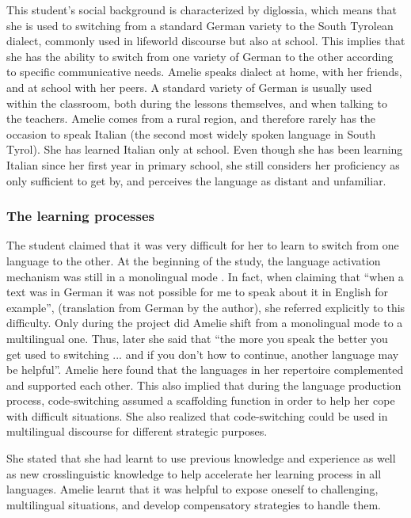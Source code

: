 \documentclass[output=paper]{../langscibook}
\begin{document}
This student’s social background is characterized by diglossia, which means that she is used to switching from a standard German variety to the South Tyrolean dialect, commonly used in lifeworld discourse but also at school. This implies that she has the ability to switch from one variety of German to the other according to specific communicative needs. Amelie speaks dialect at home, with her friends, and at school with her peers. A standard variety of German is usually used within the classroom, both during the lessons themselves, and when talking to the teachers. Amelie comes from a rural region, and therefore rarely has the occasion to speak Italian (the second most widely spoken language in South Tyrol). She has learned Italian only at school. Even though she has been learning Italian since her first year in primary school, she still considers her proficiency as only sufficient to get by, and perceives the language as distant and unfamiliar.


\subsubsection{The learning processes}

The student claimed that it was very difficult for her to learn to switch from one language to the other. At the beginning of the study, the language activation mechanism was still in a monolingual mode \citep{Grosjean2007}. In fact, when claiming that “when a text was in German it was not possible for me to speak about it in English for example”, (translation from German by the author), she referred explicitly to this difficulty. Only during the project did Amelie shift from a monolingual mode to a multilingual one. Thus, later she said that “the more you speak the better you get used to switching ... and if you don’t how to continue, another language may be helpful”. Amelie here found that the languages in her repertoire complemented and supported each other. This also implied that during the language production process, code-switching assumed a scaffolding function in order to help her cope with difficult situations. She also realized that code-switching could be used in multilingual discourse for different strategic purposes.

She stated that she had learnt to use previous knowledge and experience as well as new crosslinguistic knowledge to help accelerate her learning process in all languages. Amelie learnt that it was helpful to expose oneself to challenging, multilingual situations, and develop compensatory strategies to handle them. 
\end{document}
